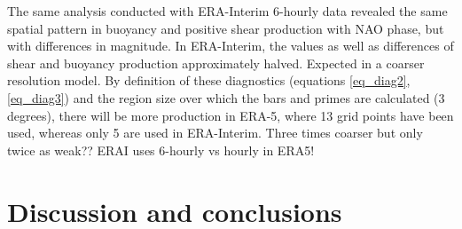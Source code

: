



The same analysis conducted with ERA-Interim 6-hourly data revealed the same spatial pattern in buoyancy and positive shear production with NAO phase, but with differences in magnitude. In ERA-Interim, the values as well as differences of shear and buoyancy production approximately halved. Expected in a coarser resolution model. By definition of these diagnostics (equations \ref{eq_diag2}, \ref{eq_diag3}) and the region size over which the bars and primes are calculated (3 degrees), there will be more production in ERA-5, where 13 grid points have been used, whereas only 5 are used in ERA-Interim.
Three times coarser but only twice as weak?? ERAI uses 6-hourly vs hourly in ERA5!


\section{Discussion and conclusions}

